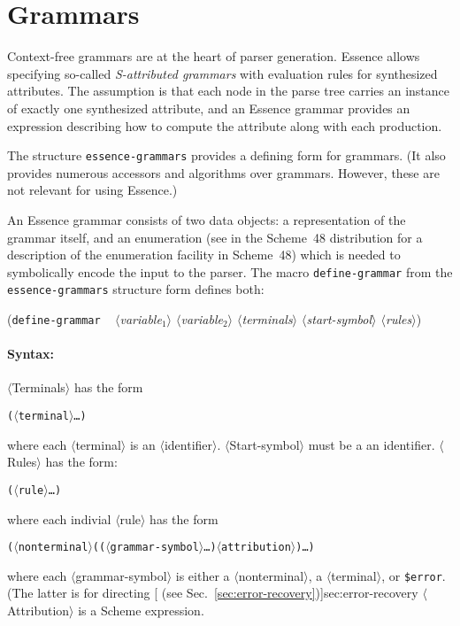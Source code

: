 \documentclass{article}
\newcommand{\meta}[1]{{\noindent\mbox{\textrm{$\langle$#1$\rangle$}}}}
\newcommand{\pproto}[2]{\unskip%
\mbox{\texonly{\spaceskip=0.5em}#1}%
\mbox{ }\texonly{\nobreak}\htmlonly{ }\textrm{#2}}
\newcommand{\proto}[3]{\par\bigskip\begin{flushleft}\pproto{(\texttt{#1}}{\textit{#2})}\hspace*{\fill}{#3}\end{flushleft}}
\newcommand{\dotsfoo}{\ldots\texonly{\thinspace}}
\newcommand{\codefont}[1]{\texttt{#1}}
\begin{document}
\section{Grammars}
\label{sec:grammars}

Context-free grammars are at the heart of parser generation.  Essence
allows specifying so-called \emph{S-attributed grammars} with
evaluation rules for synthesized attributes.  The assumption is that
each node in the parse tree carries an instance of exactly one
synthesized attribute, and an Essence grammar provides an expression describing 
how to compute the attribute along with each production.

The structure \codefont{essence-grammars} provides a defining form for
grammars.  (It also provides numerous accessors and algorithms over
grammars.  However, these are not relevant for using Essence.)

An Essence grammar consists of two data objects: a representation of
the grammar itself, and an enumeration (see 
in the Scheme~48 distribution for a description of the enumeration
facility in Scheme~48) which is needed to symbolically encode the
input to the parser.  The macro \codefont{define-grammar} from the
\codefont{essence-grammars} structure form defines both:

\label{form:define-grammar}
\proto{define-grammar}{ \meta{variable$_1$} \meta{variable$_2$}\hfill\linebreak\texonly{\hspace*{1em}}
    \meta{terminals}
  \meta{start-symbol} \meta{rules}}{syntax}

\paragraph{Syntax:} \meta{Terminals} has the form
%
\begin{alltt}
  (\meta{terminal} \dotsfoo)
\end{alltt}
%
where each \meta{terminal} is an \meta{identifier}.  
\meta{Start-symbol} must
be a an identifier.  \meta{Rules} has the form:
%
\begin{alltt}
  (\meta{rule} \dotsfoo)
\end{alltt}
%
where each indivial \meta{rule} has the form
%
\begin{alltt}
  (\meta{nonterminal} ((\meta{grammar-symbol} \dotsfoo) \meta{attribution}) \dotsfoo)
\end{alltt}
%
where each \meta{grammar-symbol} is either a \meta{nonterminal}, a
\meta{terminal}, or \codefont{\$error}.  (The latter is for directing
[ (see
Sec.~\ref{sec:error-recovery})]{sec:error-recovery} \meta{Attribution}
is a Scheme expression.
\end{document}
